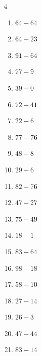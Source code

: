 \begin{multicols}{4}
\begin{enumerate}
  \item $64-64$
        \phantom{$=0$}

  \item $64-23$
        \phantom{$=41$}

  \item $91-64$
        \phantom{$=27$}

  \item $77-9$
        \phantom{$=68$}

  \item $39-0$
        \phantom{$=39$}

  \item $72-41$
        \phantom{$=31$}

  \item $22-6$
        \phantom{$=16$}

  \item $77-76$
        \phantom{$=1$}

  \item $48-8$
        \phantom{$=40$}

  \item $29-6$
        \phantom{$=23$}

  \item $82-76$
        \phantom{$=6$}

  \item $47-27$
        \phantom{$=20$}

  \item $75-49$
        \phantom{$=26$}

\columnbreak %

\resetques

  \item $18-1$
        \phantom{$=17$}

  \item $83-64$
        \phantom{$=19$}

  \item $98-18$
        \phantom{$=80$}

  \item $58-10$
        \phantom{$=48$}

  \item $27-14$
        \phantom{$=13$}

  \item $26-3$
        \phantom{$=23$}

  \item $47-44$
        \phantom{$=3$}

  \item $83-14$
        \phantom{$=69$}


\end{enumerate}
\end{multicols}
